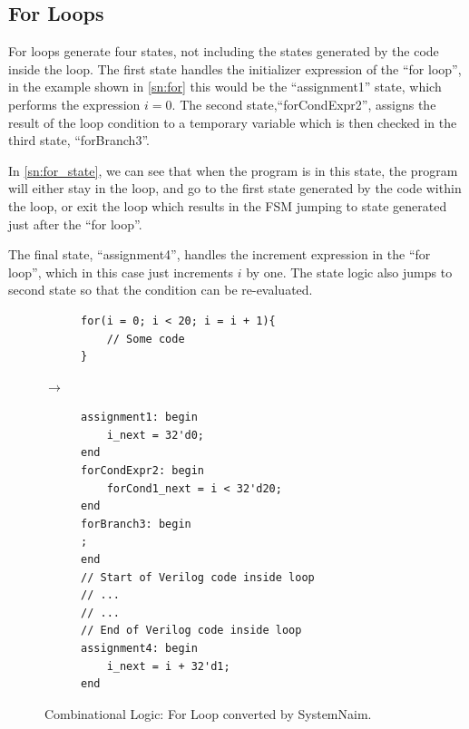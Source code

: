 \subsection{For Loops}

For loops generate four states, not including the states generated by the code inside the loop. The first state handles the initializer expression of the “for loop”, in the example shown in \autoref{sn:for} this would be the “assignment1” state, which performs the expression $i = 0$. The second state,“forCondExpr2”, assigns the result of the loop condition to a temporary variable which is then checked in the third state, “forBranch3”.

In \autoref{sn:for_state}, we can see that when the program is in this state, the program will either stay in the loop, and go to the first state generated by the code within the loop, or exit the loop which results in the FSM jumping to state generated just after the “for loop”.

The final state, “assignment4”, handles the increment expression in the “for loop”, which in this case just increments $i$ by one. The state logic also jumps to second state so that the condition can be re-evaluated.

\begin{figure}[H]
\centering
\begin{subfigure}{0.42\textwidth}
    \centering
    \begin{verbatim}
for(i = 0; i < 20; i = i + 1){
    // Some code
}
    \end{verbatim}
\end{subfigure}%
{\LARGE$\rightarrow$}%
\begin{subfigure}{0.5\textwidth}
    \begin{verbatim}
assignment1: begin
    i_next = 32'd0;
end
forCondExpr2: begin
    forCond1_next = i < 32'd20;
end
forBranch3: begin
;
end
// Start of Verilog code inside loop
// ...
// ...
// End of Verilog code inside loop
assignment4: begin
    i_next = i + 32'd1;
end
    \end{verbatim}
\end{subfigure}
\caption{Combinational Logic: For Loop converted by SystemNaim.}
\label{sn:for}
\end{figure}

